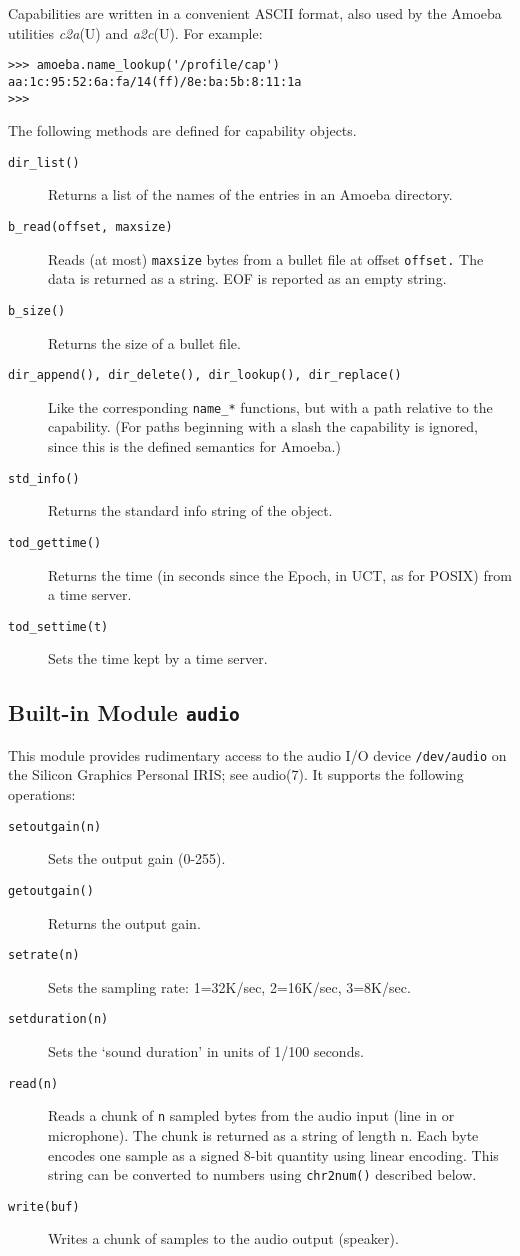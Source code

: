 Capabilities are written in a convenient ASCII format, also used by the
Amoeba utilities
{\em c2a}(U)
and
{\em a2c}(U).
For example:
\begin{code}\begin{verbatim}
>>> amoeba.name_lookup('/profile/cap')
aa:1c:95:52:6a:fa/14(ff)/8e:ba:5b:8:11:1a
>>> 
\end{verbatim}\end{code}
The following methods are defined for capability objects.
\begin{description}
\item[{\tt dir\_list()}]
Returns a list of the names of the entries in an Amoeba directory.
\item[{\tt b\_read(offset, maxsize)}]
Reads (at most)
{\tt maxsize}
bytes from a bullet file at offset
{\tt offset.}
The data is returned as a string.
EOF is reported as an empty string.
\item[{\tt b\_size()}]
Returns the size of a bullet file.
\item[{\tt dir\_append(), dir\_delete(), dir\_lookup(), dir\_replace()}]
Like the corresponding
{\tt name\_*}
functions, but with a path relative to the capability.
(For paths beginning with a slash the capability is ignored, since this
is the defined semantics for Amoeba.)
\item[{\tt std\_info()}]
Returns the standard info string of the object.
\item[{\tt tod\_gettime()}]
Returns the time (in seconds since the Epoch, in UCT, as for POSIX) from
a time server.
\item[{\tt tod\_settime(t)}]
Sets the time kept by a time server.
\end{description}

\subsection{Built-in Module {\tt audio}}

This module provides rudimentary access to the audio I/O device
{\tt /dev/audio}
on the Silicon Graphics Personal IRIS; see audio(7).
It supports the following operations:
\begin{description}
\item[{\tt setoutgain(n)}]
Sets the output gain (0-255).
\item[{\tt getoutgain()}]
Returns the output gain.
\item[{\tt setrate(n)}]
Sets the sampling rate: 1=32K/sec, 2=16K/sec, 3=8K/sec.
\item[{\tt setduration(n)}]
Sets the `sound duration' in units of 1/100 seconds.
\item[{\tt read(n)}]
Reads a chunk of
{\tt n}
sampled bytes from the audio input (line in or microphone).
The chunk is returned as a string of length n.
Each byte encodes one sample as a signed 8-bit quantity using linear
encoding.
This string can be converted to numbers using {\tt chr2num()} described
below.
\item[{\tt write(buf)}]
Writes a chunk of samples to the audio output (speaker).
\end{description}

